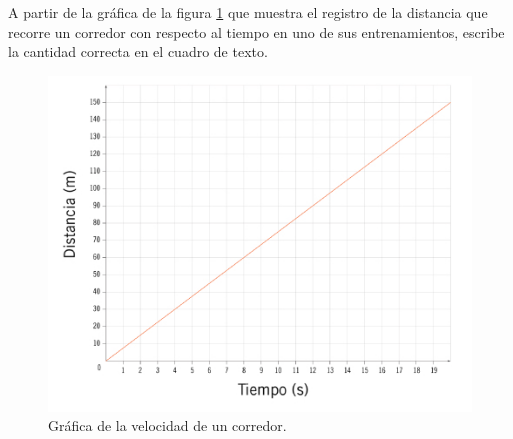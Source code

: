 A partir de la gráfica de la figura \ref{fig:SINMAT1_U3_AC75_IMG2} que muestra el registro de la distancia que recorre un corredor con respecto al tiempo en uno de sus entrenamientos, escribe la cantidad correcta en el cuadro de texto.

\begin{multicols}{2}
    \begin{figure}[H]
        \centering
        \includegraphics[width=0.8\linewidth]{../images/SINMAT1_U3_AC75_IMG2.jpg}
        \caption{Gráfica de la velocidad de un corredor.}
        \label{fig:SINMAT1_U3_AC75_IMG2}
    \end{figure}
    \begin{parts}
        \part 
        \part 
        \part 
        \part 
        \part 
    \end{parts}
\end{multicols}